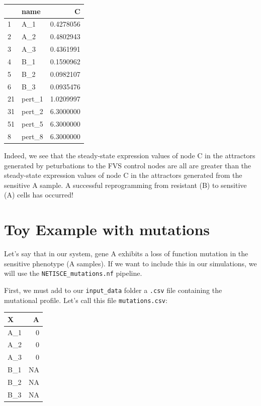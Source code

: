 \documentclass[
]{book}
\begin{document}
\begin{tabular}{l|l|r}
\hline
  & name & C\\
\hline
1 & A\_1 & 0.4278056\\
\hline
2 & A\_2 & 0.4802943\\
\hline
3 & A\_3 & 0.4361991\\
\hline
4 & B\_1 & 0.1590962\\
\hline
5 & B\_2 & 0.0982107\\
\hline
6 & B\_3 & 0.0935476\\
\hline
21 & pert\_1 & 1.0209997\\
\hline
31 & pert\_2 & 6.3000000\\
\hline
51 & pert\_5 & 6.3000000\\
\hline
8 & pert\_8 & 6.3000000\\
\hline
\end{tabular}

Indeed, we see that the steady-state expression values of node C in the attractors generated by peturbations to the FVS control nodes are all are greater than the steady-state expression values of node C in the attractors generated from the sensitive A sample. A successful reprogramming from resistant (B) to sensitive (A) cells has occurred!

\hypertarget{toy-example-with-mutations}{%
\section{Toy Example with mutations}\label{toy-example-with-mutations}}

Let's say that in our system, gene A exhibits a loss of function mutation in the sensitive phenotype (A samples). If we want to include this in our simulations, we will use the \texttt{NETISCE\_mutations.nf} pipeline.

First, we must add to our \texttt{input\_data} folder a \texttt{.csv} file containing the mutational profile. Let's call this file \texttt{mutations.csv}:

\begin{tabular}{l|r}
\hline
X & A\\
\hline
A\_1 & 0\\
\hline
A\_2 & 0\\
\hline
A\_3 & 0\\
\hline
B\_1 & NA\\
\hline
B\_2 & NA\\
\hline
B\_3 & NA\\
\hline
\end{tabular}
\end{document}
